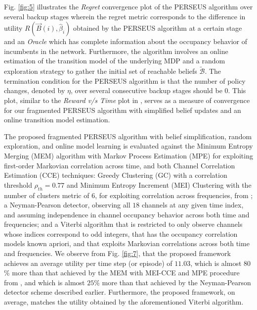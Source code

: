\documentclass[10pt,twocolumn]{IEEEtran}
\begin{document}
Fig. \ref{fig:5} illustrates the \emph{Regret} convergence plot of the PERSEUS algorithm over several backup stages wherein the regret metric corresponds to the difference in utility $R(\vec{B}(i), \hat{\beta}_{i})$ obtained by the PERSEUS algorithm at a certain stage and an \emph{Oracle} which has complete information about the occupancy behavior of incumbents in the network. Furthermore, the algorithm involves an online estimation of the transition model of the underlying MDP and a random exploration strategy to gather the initial set of reachable beliefs $\tilde{\mathcal{B}}$. The termination condition for the PERSEUS algorithm is that the number of policy changes, denoted by $\eta$, over several consecutive backup stages should be $0$. This plot, similar to the \emph{Reward v/s Time} plot in \cite{DBLP:journals/corr/abs-1109-2145}, serves as a measure of convergence for our fragmented PERSEUS algorithm with simplified belief updates and an online transition model estimation.

The proposed fragmented PERSEUS algorithm with belief simplification, random exploration, and online model learning is evaluated against the Minimum Entropy Merging (MEM) algorithm with Markov Process Estimation (MPE) for exploiting first-order Markovian correlation across time, and both Channel Correlation Estimation (CCE) techniques: Greedy Clustering (GC) with a correlation threshold $\rho_{th}{=}0.77$ and Minimum Entropy Increment (MEI) Clustering with the number of clusters metric of $6$, for exploiting correlation across frequencies, from \cite{6956794}; a Neyman-Pearson detector, observing all $18$ channels at any given time index, and assuming independence in channel occupancy behavior across both time and frequencies; and a Viterbi algorithm that is restricted to only observe channels whose indices correspond to odd integers, that has the occupancy correlation models known apriori, and that exploits Markovian correlations across both time and frequencies. We observe from Fig. \ref{fig:7}, that the proposed framework achieves an average utility per time step (or episode) of $11.03$, which is almost $80$\% more than that achieved by the MEM with MEI-CCE and MPE procedure from \cite{6956794}, and which is almost $25$\% more than that achieved by the Neyman-Pearson detector scheme described earlier. Furthermore, the proposed framework, on average, matches the utility obtained by the aforementioned Viterbi algorithm.
\vspace{-2.5mm}
\end{document}
